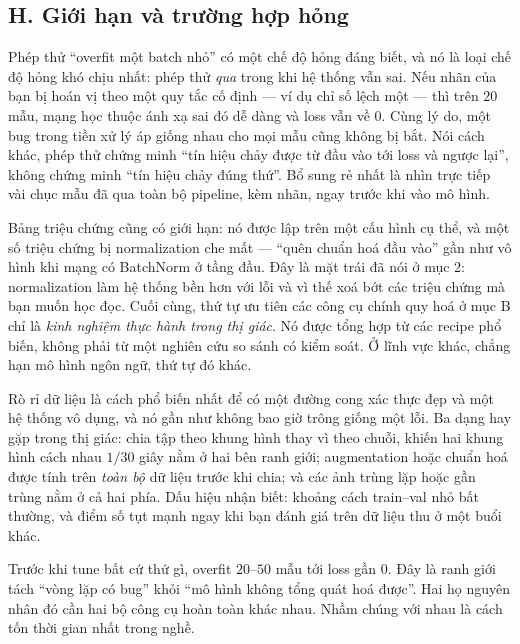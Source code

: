 \documentclass[../../../deep_learning.tex]{subfiles}
\begin{document}
\subsection{H. Giới hạn và trường hợp hỏng}
Phép thử ``overfit một batch nhỏ'' có một chế độ hỏng đáng biết, và nó là loại chế độ hỏng khó chịu nhất: phép thử \emph{qua} trong khi hệ thống vẫn sai. Nếu nhãn của bạn bị hoán vị theo một quy tắc cố định --- ví dụ chỉ số lệch một --- thì trên \(20\) mẫu, mạng học thuộc ánh xạ sai đó dễ dàng và loss vẫn về \(0\). Cùng lý do, một bug trong tiền xử lý áp giống nhau cho mọi mẫu cũng không bị bắt. Nói cách khác, phép thử chứng minh ``tín hiệu chảy được từ đầu vào tới loss và ngược lại'', không chứng minh ``tín hiệu chảy đúng thứ''. Bổ sung rẻ nhất là nhìn trực tiếp vài chục mẫu đã qua toàn bộ pipeline, kèm nhãn, ngay trước khi vào mô hình.

Bảng triệu chứng cũng có giới hạn: nó được lập trên một cấu hình cụ thể, và một số triệu chứng bị normalization che mất --- ``quên chuẩn hoá đầu vào'' gần như vô hình khi mạng có BatchNorm ở tầng đầu. Đây là mặt trái đã nói ở mục 2: normalization làm hệ thống bền hơn với lỗi và vì thế xoá bớt các triệu chứng mà bạn muốn học đọc. Cuối cùng, thứ tự ưu tiên các công cụ chính quy hoá ở mục B chỉ là \emph{kinh nghiệm thực hành trong thị giác}. Nó được tổng hợp từ các recipe phổ biến, không phải từ một nghiên cứu so sánh có kiểm soát. Ở lĩnh vực khác, chẳng hạn mô hình ngôn ngữ, thứ tự đó khác.

\begin{cambay}
Rò rỉ dữ liệu là cách phổ biến nhất để có một đường cong xác thực đẹp và một hệ thống vô dụng, và nó gần như không bao giờ trông giống một lỗi. Ba dạng hay gặp trong thị giác: chia tập theo khung hình thay vì theo chuỗi, khiến hai khung hình cách nhau \(1/30\) giây nằm ở hai bên ranh giới; augmentation hoặc chuẩn hoá được tính trên \emph{toàn bộ} dữ liệu trước khi chia; và các ảnh trùng lặp hoặc gần trùng nằm ở cả hai phía. Dấu hiệu nhận biết: khoảng cách train--val nhỏ bất thường, và điểm số tụt mạnh ngay khi bạn đánh giá trên dữ liệu thu ở một buổi khác.
\end{cambay}

\begin{cannho}
Trước khi tune bất cứ thứ gì, overfit \(20\)--\(50\) mẫu tới loss gần \(0\). Đây là ranh giới tách ``vòng lặp có bug'' khỏi ``mô hình không tổng quát hoá được''. Hai họ nguyên nhân đó cần hai bộ công cụ hoàn toàn khác nhau. Nhầm chúng với nhau là cách tốn thời gian nhất trong nghề. 
\end{cannho}
\end{document}
